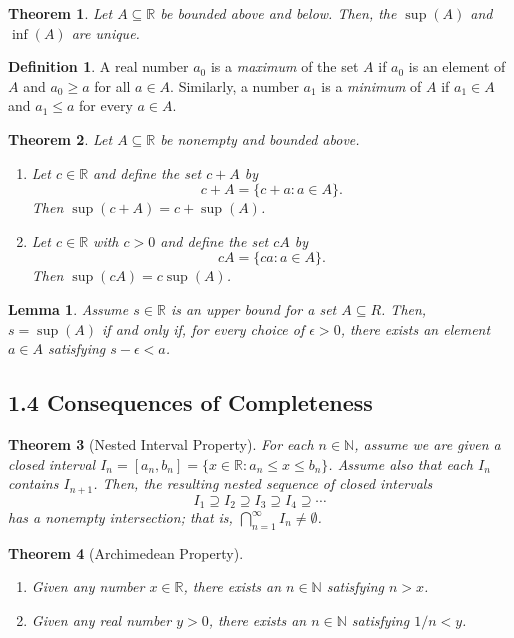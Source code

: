 \documentclass{amsart}
\newtheorem*{theorem}{Theorem}
\newtheorem*{lemma}{Lemma}
\theoremstyle{definition}
\newtheorem*{definition}{Definition}
\newcommand{\N}{\mathbb{N}}
\newcommand{\R}{\mathbb{R}}
\newcommand{\st}{\mathrel{:}}
\begin{document}
\begin{theorem}
  Let $A \subseteq \R$ be bounded above and below. Then, the $\sup(A)$ and
  $\inf(A)$ are unique.
\end{theorem}

\begin{definition}
  A real number $a_0$ is a \emph{maximum} of the set $A$ if $a_0$ is an element
  of $A$ and $a_0 \ge a$ for all $a \in A$. Similarly, a number $a_1$ is a
  \emph{minimum} of $A$ if $a_1 \in A$ and $a_1 \le a$ for every $a \in A$.
\end{definition}

\begin{theorem}
  Let $A \subseteq \R$ be nonempty and bounded above.
  \begin{enumerate}[label={(\roman*)}]
    \item Let $c \in \R$ and define the set $c + A$ by
      \[
        c + A = \{c + a \st a \in A\}.
      \]
      Then $\sup(c + A) = c + \sup(A)$.
    \item Let $c \in \R$ with $c > 0$ and define the set $cA$ by
      \[
        cA = \{ca \st a \in A\}.
      \]
      Then $\sup(cA) = c \sup(A)$.
  \end{enumerate}
\end{theorem}

\begin{lemma}
  Assume $s \in \R$ is an upper bound for a set $A \subseteq R$. Then, $s =
  \sup(A)$ if and only if, for every choice of $\epsilon > 0$, there exists an
  element $a \in A$ satisfying $s - \epsilon < a$.
\end{lemma}

\subsection*{1.4 Consequences of Completeness}

\begin{theorem}[Nested Interval Property]
  For each $n \in \N$, assume we are given a closed interval $I_n = [a_n, b_n] =
  \{x \in \R \st a_n \le x \le b_n\}$. Assume also that each $I_n$ contains
  $I_{n+1}$. Then, the resulting nested sequence of closed intervals
  \[
    I_1 \supseteq I_2 \supseteq I_3 \supseteq I_4 \supseteq \cdots
  \]
  has a nonempty intersection; that is, $\bigcap_{n=1}^{\infty} I_n \neq
  \emptyset$.
\end{theorem}

\begin{theorem}[Archimedean Property]
  \begin{enumerate}[label={(\roman*)}]
    \item Given any number $x \in \R$, there exists an $n \in \N$ satisfying $n
      > x$.
    \item Given any real number $y > 0$, there exists an $n \in \N$ satisfying
      $1/n < y$.
  \end{enumerate}
\end{theorem}
\end{document}
